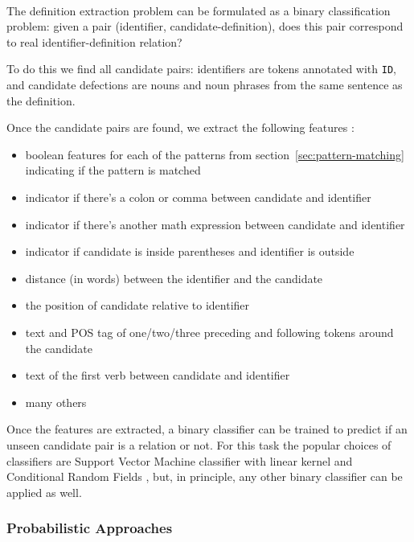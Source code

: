 \ \\

The definition extraction problem can be formulated as a binary classification
problem: given a pair (identifier, candidate-definition), does this pair 
correspond to real identifier-definition relation? 

To do this we find all candidate pairs: identifiers are tokens 
annotated with \texttt{ID}, and candidate defections are nouns and 
noun phrases from the same sentence as the definition. 

Once the candidate pairs are found, we extract the following features \cite{kristianto2014extracting} \cite{yokoi2011contextual}:


\begin{itemize}
\itemsep1pt\parskip0pt
  \item boolean features for each of the patterns from 
    section~\ref{sec:pattern-matching} indicating if the pattern is matched
  \item indicator if there's a colon or comma between candidate and identifier
  \item indicator if there's another math expression between candidate and identifier
  \item indicator if candidate is inside parentheses and identifier is outside
  \item distance (in words) between the identifier and the candidate
  \item the position of candidate relative to identifier
  \item text and POS tag of one/two/three preceding and following tokens around the candidate
  \item text of the first verb between candidate and identifier
  \item many others
\end{itemize}

Once the features are extracted, a binary classifier can be trained to predict
if an unseen candidate pair is a relation or not. 
For this task the popular choices of classifiers are Support Vector Machine 
classifier with linear kernel \cite{kristianto2014extracting} \cite{yokoi2011contextual}
and Conditional Random Fields \cite{kristianto2014extracting},
but, in principle, any other binary classifier can be applied 
as well.


\subsubsection{Probabilistic Approaches} \label{sec:mlp}

